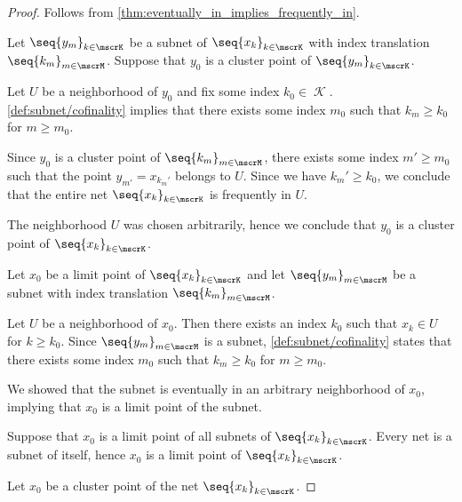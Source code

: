 \begin{proof}
   Follows from \cref{thm:eventually_in_implies_frequently_in}.

   Let \( \seq{ y_m }_{k \in \mscrK} \) be a subnet of \( \seq{ x_k }_{k \in \mscrK} \) with index translation \( \seq{ k_m }_{m \in \mscrM} \). Suppose that \( y_0 \) is a cluster point of \( \seq{ y_m }_{k \in \mscrK} \).

  Let \( U \) be a neighborhood of \( y_0 \) and fix some index \( k_0 \in \mscrK \). \ref{def:subnet/cofinality} implies that there exists some index \( m_0 \) such that \( k_m \geq k_0 \) for \( m \geq m_0 \).

  Since \( y_0 \) is a cluster point of \( \seq{ k_m }_{m \in \mscrM} \), there exists some index \( m' \geq m_0 \) such that the point \( y_{m'} = x_{k_m'} \) belongs to \( U \). Since we have \( k_m' \geq k_0 \), we conclude that the entire net \( \seq{ x_k }_{k \in \mscrK} \) is frequently in \( U \).

  The neighborhood \( U \) was chosen arbitrarily, hence we conclude that \( y_0 \) is a cluster point of \( \seq{ x_k }_{k \in \mscrK} \).


  \SufficiencySubProof* Let \( x_0 \) be a limit point of \( \seq{ x_k }_{k \in \mscrK} \) and let \( \seq{ y_m }_{m \in \mscrM} \) be a subnet with index translation \( \seq{ k_m }_{m \in \mscrM} \).

  Let \( U \) be a neighborhood of \( x_0 \). Then there exists an index \( k_0 \) such that \( x_k \in U \) for \( k \geq k_0 \). Since \( \seq{ y_m }_{m \in \mscrM} \) is a subnet, \ref{def:subnet/cofinality} states that there exists some index \( m_0 \) such that \( k_m \geq k_0 \) for \( m \geq m_0 \).

  We showed that the subnet is eventually in an arbitrary neighborhood of \( x_0 \), implying that \( x_0 \) is a limit point of the subnet.

  \NecessitySubProof* Suppose that \( x_0 \) is a limit point of all subnets of \( \seq{ x_k }_{k \in \mscrK} \). Every net is a subnet of itself, hence \( x_0 \) is a limit point of \( \seq{ x_k }_{k \in \mscrK} \).


  \SufficiencySubProof* Let \( x_0 \) be a cluster point of the net \( \seq{ x_k }_{k \in \mscrK} \).


\end{proof}
